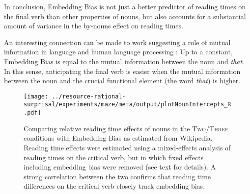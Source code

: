 In conclusion, Embedding Bias is not just a better predictor of reading times on the final verb than other properties of nouns, but also accounts for a substantial amount of variance in the by-nouns effect on reading times.

An interesting connection can be made to work suggesting a role of mutual information in language and human language processing \citep[e.g.][]{Culbertson2020FROMTW}:
Up to a constant, Embedding Bias is equal to the mutual information between the noun and \textit{that}.
In this sense, anticipating the final verb is easier when the mutual information between the noun and the crucial functional element (the word \textit{that}) is higher.



\begin{figure}
	\centering
    \texttt{[image: ../resource-rational-surprisal/experiments/maze/meta/output/plotNounIntercepts\_R.pdf]}


	\caption{Comparing relative reading time effects of nouns in the \textsc{Two}/\textsc{Three} conditions with Embedding Bias as estimated from Wikipedia. Reading time effects were estimated using a mixed-effects analysis of reading times on the critical verb, but in which fixed effects including embedding bias were removed (see text for details). A strong correlation between the two confirms that reading time differences on the critical verb closely track embedding bias.}\label{fig:effect-embrate-corr}
\end{figure}



